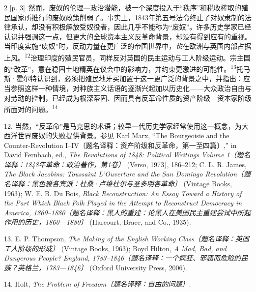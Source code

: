 \documentclass[10pt,a4paper]{article}
\begin{document}
\begin{paracol}{2}
{\scriptsize\color{gray} [p. 3]}\ 然而，废奴的伦理—政治潜能，被一个深度投入于“秩序”和税收榨取的殖民国家所推行的废奴政策削弱了。事实上，1843年第五号法令终止了对奴隶制的法律承认，却没有积极解放受奴役者，因此几乎不能称为“废奴”。许多历史学家已经认识并强调这一点，但更大的全球资本主义反革命背景，却没有得到应有的重视。当印度实施“废奴”时，反动力量在更广泛的帝国世界中，\textit{也}在欧洲与英国内部占据上\mbox{风。\textsuperscript{12}}治理印度的殖民官员，同样反对英国的民主运动与工人阶级运动。宗主国的“改革”，意在稳固土地精英在议会中的影响力，并约束更激进的可能\mbox{性。\textsuperscript{13}}托马斯·霍尔特认识到，必须把殖民地牙买加置于这一更广泛的背景之中，并指出：应当参照这样一种情境，对种族主义话语的逐渐兴起加以历史化——大众政治自由与对劳动的控制，已经成为根深蒂固、因而具有反革命性质的资产阶级—资本家阶级所面对的问\mbox{题。\textsuperscript{14}}\par{\small 12. 当然，“反革命”是马克思的术语；较早一代历史学家经常使用这一概念，为大西洋世界废奴的失败提供背景。参见 Karl Marx, “The Bourgeoisie and the Counter-Revolution I–IV〔题名译释：资产阶级和反革命，第一至四篇〕,” in David Fernbach, ed., \textit{The Revolutions of 1848: Political Writings Volume 1〔题名译释：1848年革命：政治著作，第1卷〕} (Verso, 1973), 186–212; C. L. R. James, \textit{The Black Jacobins: Toussaint L’Ouverture and the San Domingo Revolution〔题名译释：黑色雅各宾派：杜桑·卢维杜尔与圣多明各革命〕} (Vintage Books, 1963); W. E. B. Du Bois, \textit{Black Reconstruction: An Essay Toward a History of the Part Which Black Folk Played in the Attempt to Reconstruct Democracy in America, 1860–1880〔题名译释：黑人的重建：论黑人在美国民主重建尝试中所起作用的历史，1860—1880〕} (Harcourt, Brace, and Co., 1935).\par}{\small 13. E. P. Thompson, \textit{The Making of the English Working Class〔题名译释：英国工人阶级的形成〕} (Vintage Books, 1963); Boyd Hilton, \textit{A Mad, Bad, and Dangerous People? England, 1783–1846〔题名译释：一个疯狂、邪恶而危险的民族？英格兰，1783—1846〕} (Oxford University Press, 2006).\par}{\small 14. Holt, \textit{The Problem of Freedom〔题名译释：自由的问题〕.}\par}
\switchcolumn

\end{paracol}
\end{document}
